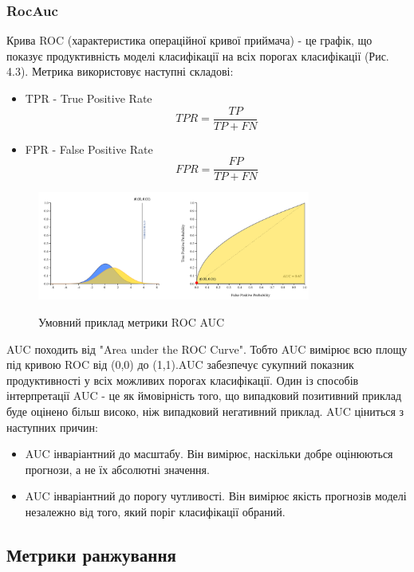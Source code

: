 \subsubsection{RocAuc}
Крива ROC (характеристика операційної кривої приймача) - це графік, що показує продуктивність моделі класифікації на всіх порогах класифікації (Рис. 4.3). Метрика використовує наступні складові:
\begin{itemize}
    \item TPR - True Positive Rate
          \[TPR = \frac{TP}{TP + FN}\]
    \item FPR - False Positive Rate
          \[FPR=\frac{FP}{TP + FN}\]
\end{itemize}
\begin{figure}
    \centering
    \includegraphics[width=0.8\textwidth]{images/auc_roc.png}
    \label{fig:auc_roc}
    \caption{Умовний приклад метрики ROC AUC}
\end{figure}
AUC походить від "Area under the ROC Curve". Тобто AUC вимірює всю  площу під кривою ROC від (0,0) до (1,1).AUC забезпечує сукупний показник продуктивності у всіх можливих порогах класифікації. Один із способів інтерпретації AUC - це як ймовірність того, що випадковий позитивний приклад буде оцінено більш високо, ніж випадковий негативний приклад.
AUC ціниться з наступних причин:
\begin{itemize}
    \item AUC інваріантний до масштабу. Він вимірює, наскільки добре оцінюються прогнози, а не їх абсолютні значення.
    \item AUC інваріантний до порогу чутливості. Він вимірює якість прогнозів моделі незалежно від того, який поріг класифікації обраний.
\end{itemize}

\subsection{Метрики ранжування}


